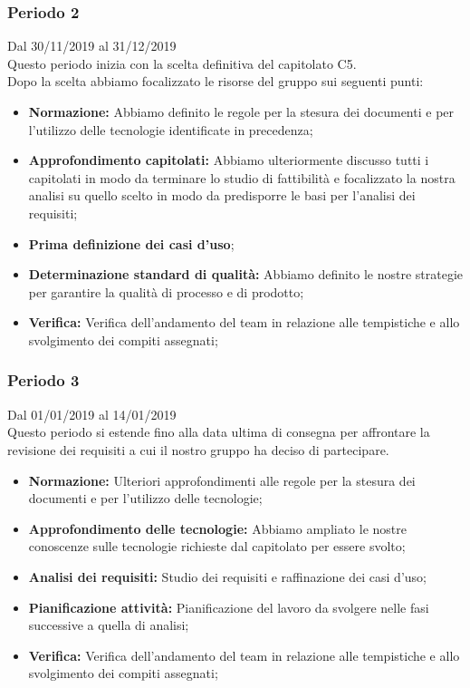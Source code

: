 \subsubsection{Periodo 2} 
Dal 30/11/2019 al 31/12/2019\\
Questo periodo inizia con la scelta definitiva del capitolato C5.\\
Dopo la scelta abbiamo focalizzato le risorse del gruppo sui seguenti punti:
\begin{itemize}
	\item \textbf{Normazione: }Abbiamo definito le regole per la stesura dei documenti e per l'utilizzo delle tecnologie identificate in precedenza;
	\item \textbf{Approfondimento capitolati: }Abbiamo ulteriormente discusso tutti i capitolati in modo da terminare lo studio di fattibilità e focalizzato la nostra analisi su quello scelto in modo da predisporre le basi per l'analisi dei requisiti;
	\item \textbf{Prima definizione dei casi d'uso};
	\item \textbf{Determinazione standard di qualità: }Abbiamo definito le nostre strategie per garantire la qualità di processo e di prodotto;
	\item \textbf{Verifica: }Verifica dell'andamento del team in relazione alle tempistiche e allo svolgimento dei compiti assegnati;
\end{itemize}
\subsubsection{Periodo 3}
 Dal 01/01/2019 al 14/01/2019\\
 Questo periodo si estende fino alla data ultima di consegna per affrontare la revisione dei requisiti a cui il nostro gruppo ha deciso di partecipare.\\
 \begin{itemize}
	\item \textbf{Normazione: }Ulteriori approfondimenti alle regole per la stesura dei documenti e per l'utilizzo delle tecnologie;
	\item \textbf{Approfondimento delle tecnologie: }Abbiamo ampliato le nostre conoscenze sulle tecnologie richieste dal capitolato per essere svolto;
	\item \textbf{Analisi dei requisiti: } Studio dei requisiti e raffinazione dei casi d'uso;
	\item \textbf{Pianificazione attività: }Pianificazione del lavoro da svolgere nelle fasi successive a quella di analisi;
	\item \textbf{Verifica: }Verifica dell'andamento del team in relazione alle tempistiche e allo svolgimento dei compiti assegnati;

 \end{itemize}
